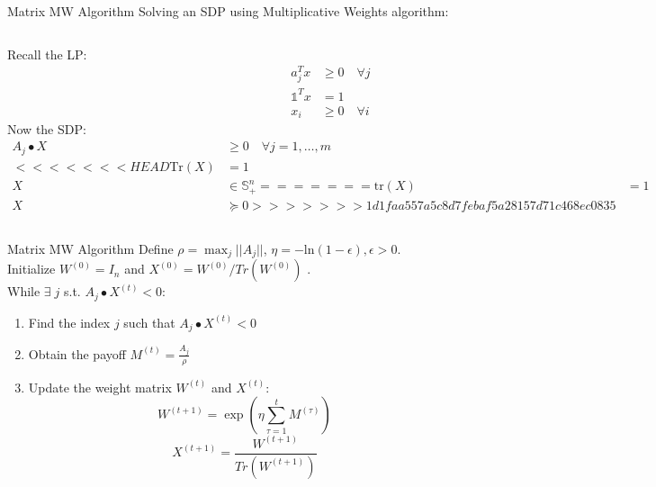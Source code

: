 \documentclass{beamer}
\begin{document}
\begin{frame}{Matrix MW Algorithm}
Solving an SDP using Multiplicative Weights algorithm: \\ \vspace{.5cm}
\begin{columns}[T]
Recall the LP: 
\begin{align*}
a_j^Tx &\geq 0 \quad \forall j \\
\mathds{1}^Tx &= 1 \\
x_i &\geq 0 \quad \forall i
\end{align*}
Now the SDP:
\begin{align*}
A_j \bullet X &\geq 0 \quad \forall j = 1,\ldots,m \\
<<<<<<< HEAD
\text{Tr}(X) &= 1 \\
X & \in \mathbb S_+^n
=======
\text{tr}(X) &= 1 \\
X & \succcurlyeq 0
>>>>>>> 1d1faa557a5c8d7febaf5a28157d71c468ec0835
\end{align*}
\end{columns}
\end{frame}


\begin{frame}{Matrix MW Algorithm}
Define $\rho = \max_j ||A_j||$, $\eta = -\text{ln}(1-\epsilon), \epsilon > 0$. \\ \vspace{.5cm}
Initialize $W^{(0)} = I_n$ \quad and $X^{(0)} = W^{(0)}/Tr(W^{(0)})$ . \\ \vspace{.5cm}
While $\exists \; j$ s.t. $A_j \bullet X^{(t)} < 0$:
\begin{enumerate}
\setlength\itemsep{1.2em}
\item Find the index $j$ such that $A_j \bullet X^{(t)} < 0$
\item Obtain the payoff $M^{(t)} = \frac{A_j}{\rho}$
\item Update the weight matrix $W^{(t)}$ and $X^{(t)}$:
$$ W^{(t+1)} = \exp \left(\eta \sum_{\tau =1}^t M^{(\tau)}\right)$$
$$
X^{(t+1)} = \frac{W^{(t+1)}}{Tr(W^{(t+1)})}
$$
\end{enumerate}
\end{frame}
\end{document}
